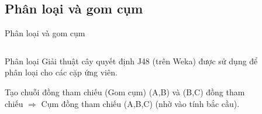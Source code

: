 \documentclass[9pt,xcolor=table,hyperref=unicode]{beamer}
\begin{document}
	\subsection{Phân loại và gom cụm}
	\begin{frame}{Phân loại và gom cụm}		
		\begin{columns}[t]
			\begin{column}{0.6\textwidth}
			   	\begin{block}{Phân loại}
					Giải thuật cây quyết định J48 (trên Weka) được sử dụng để phân loại cho các cặp ứng viên.
				\end{block}	
				\begin{block}{Tạo chuỗi đồng tham chiếu (Gom cụm)}
			   		(A,B) và (B,C) đồng tham chiếu $\Rightarrow$ Cụm đồng tham chiếu (A,B,C) (nhờ vào tính bắc cầu).
				\end{block}			
			\end{column}
			\begin{column}{0.4\textwidth}  %
			 	\begin{figure}[H]
					\fontsize{13pt}{13}\selectfont
					\centering				
					\resizebox{20mm}{!}{}	
				\end{figure}
			\end{column}
		\end{columns}
		\begin{columns}[t]			
			\begin{column}{\textwidth}				
			   	\begin{figure}[H]
					\LARGE 
					\resizebox{100mm}{!}{}										
				\end{figure}
			\end{column}			
		\end{columns}
	\end{frame}
\end{document}
